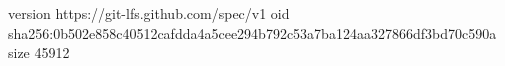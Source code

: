 version https://git-lfs.github.com/spec/v1
oid sha256:0b502e858c40512cafdda4a5cee294b792c53a7ba124aa327866df3bd70c590a
size 45912
